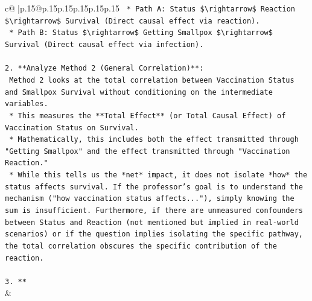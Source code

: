 \documentclass{article}
\begin{document}
{\begin{supertabular}{c@{$\;$}|p{.15\linewidth}@{}p{.15\linewidth}p{.15\linewidth}p{.15\linewidth}p{.15\linewidth}p{.15\linewidth}}
{{{\texttt{    *   Path A: Status \$\textbackslash{}rightarrow\$ Reaction \$\textbackslash{}rightarrow\$ Survival (Direct causal effect via reaction).} \\
\texttt{    *   Path B: Status \$\textbackslash{}rightarrow\$ Getting Smallpox \$\textbackslash{}rightarrow\$ Survival (Direct causal effect via infection).} \\
\\ 
\texttt{2.  **Analyze Method 2 (General Correlation)**:} \\
\texttt{    Method 2 looks at the total correlation between Vaccination Status and Smallpox Survival without conditioning on the intermediate variables.} \\
\texttt{    *   This measures the **Total Effect** (or Total Causal Effect) of Vaccination Status on Survival.} \\
\texttt{    *   Mathematically, this includes both the effect transmitted through "Getting Smallpox" and the effect transmitted through "Vaccination Reaction."} \\
\texttt{    *   While this tells us the *net* impact, it does not isolate *how* the status affects survival. If the professor's goal is to understand the mechanism ("how vaccination status affects..."), simply knowing the sum is insufficient. Furthermore, if there are unmeasured confounders between Status and Reaction (not mentioned but implied in real{-}world scenarios) or if the question implies isolating the specific pathway, the total correlation obscures the specific contribution of the reaction.} \\
\\ 
\texttt{3.  **} \\
            }
        }
    }
    & \\ \\


\end{supertabular}}
\end{document}

